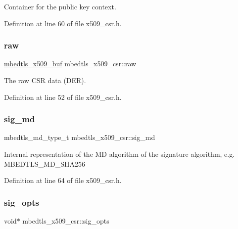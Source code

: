 Container for the public key context. 

Definition at line 60 of file x509\+\_\+csr.\+h.

\mbox{\label{structmbedtls__x509__csr_ad3c60458143eb1ddedfa573466931a70}} 
\subsubsection{\texorpdfstring{raw}{raw}}
{\footnotesize\ttfamily \mbox{\hyperlink{group__x509__module_ga4d02c9e8e4e2934555e0d132cd2976dc}{mbedtls\+\_\+x509\+\_\+buf}} mbedtls\+\_\+x509\+\_\+csr\+::raw}

The raw C\+SR data (D\+ER). 

Definition at line 52 of file x509\+\_\+csr.\+h.

\mbox{\label{structmbedtls__x509__csr_afaf345aa794cfd4b5056ce49a67bb611}} 
\subsubsection{\texorpdfstring{sig\+\_\+md}{sig\_md}}
{\footnotesize\ttfamily mbedtls\+\_\+md\+\_\+type\+\_\+t mbedtls\+\_\+x509\+\_\+csr\+::sig\+\_\+md}

Internal representation of the MD algorithm of the signature algorithm, e.\+g. M\+B\+E\+D\+T\+L\+S\+\_\+\+M\+D\+\_\+\+S\+H\+A256 

Definition at line 64 of file x509\+\_\+csr.\+h.

\mbox{\label{structmbedtls__x509__csr_ac1152e686c27158c211b2c3fdfaefdb7}} 
\subsubsection{\texorpdfstring{sig\+\_\+opts}{sig\_opts}}
{\footnotesize\ttfamily void$\ast$ mbedtls\+\_\+x509\+\_\+csr\+::sig\+\_\+opts}

